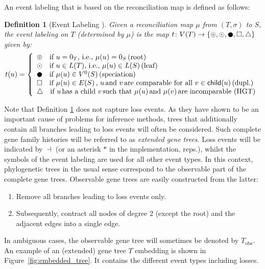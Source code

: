 \documentclass[hidelinks,11pt]{scrreprt}
\newtheorem{definition}[theorem]{Definition}
\newcommand{\ROOT}{\circledcirc}
\newcommand{\LEAF}{\odot}
\newcommand{\SPEC}{\newmoon}
\newcommand{\HGT}{\triangle}
\newcommand{\DUPL}{\square}
\newcommand{\child}{\mathsf{child}}
\begin{document}
An event labeling that is based on the reconciliation map is defined as follows:

\begin{definition}[Event Labeling {\citep[][Def. 3 with HGT]{geiss2020c}}]
	\label{def:event_labeling}
	Given a reconciliation map $\mu$ from $(T,\sigma)$ to $S$, the \emph{event labeling on $T$ (determined by $\mu$)} is the map $t\colon V(T) \to \{ \ROOT,\LEAF,\SPEC,\DUPL,\HGT \}$ given by:
	\begin{equation*}
	t(u) = \left\{
	\begin{array}{ll}
	\ROOT \quad \textrm{if } u=0_T \textrm{, i.e., } \mu(u)=0_S\, \textrm{(root)}\\
	\LEAF \quad \textrm{if } u \in L(T) \textrm{, i.e., } \mu(u) \in L(S)\, \textrm{(leaf)}\\
	\SPEC \quad \textrm{if } \mu(u) \in V^0(S)\, \textrm{(speciation)}\\
	\DUPL \quad \textrm{if } \mu(u) \in E(S)\,\textrm{, } u\,\textrm{and } v\,\textrm{are comparable for all } v \in \child(u)\, \textrm{(dupl.)}\\
	\HGT \quad \textrm{if } u\, \textrm{has a child } v\, \textrm{such that } \mu(u)\, \textrm{and } \mu(v)\, \textrm{are incomparable (HGT)}
	\end{array}
	\right.
	\end{equation*}
\end{definition}

Note that Definition \ref{def:event_labeling} does not capture loss events. As they have shown to be an important cause of problems for inference methods, trees that additionally contain all branches leading to loss events will often be considered. Such complete gene family histories will be referred to as \emph{extended gene trees}. Loss events will be indicated by $\dashv$ (or an asterisk $*$ in the implementation, reps.), whilst the symbols of the event labeling are used for all other event types. In this context, phylogenetic trees in the usual sense correspond to the observable part of the complete gene trees. Observable gene trees are easily constructed from the latter:
\begin{enumerate}[label=(\roman*), itemsep=0.2cm, topsep=0.2cm, parsep=0cm]
	\item Remove all branches leading to loss events only.
	\item Subsequently, contract all nodes of degree 2 (except the root) and the adjacent edges into a single edge.
\end{enumerate}
In ambiguous cases, the observable gene tree will sometimes be denoted by $T_\textrm{obs}$.
An example of an (extended) gene tree $T$ embedding is shown in Figure~\ref{fig:embedded_tree}. It contains the different event types including losses.
\end{document}
